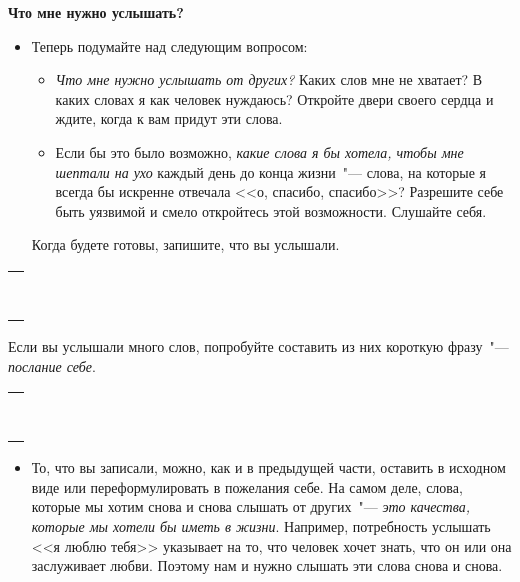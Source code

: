 \newpage
{\large \textbf{Что мне нужно услышать?}}
\begin{itemize}
	\item Теперь подумайте над следующим вопросом:
	
	\begin{itemize}
		\item \emph{Что мне нужно услышать от других?} Каких слов мне не хватает? В каких словах я как человек нуждаюсь? Откройте двери своего сердца и ждите, когда к вам придут эти слова.
		
		\item Если бы это было возможно, \emph{какие слова я бы хотела, чтобы мне шептали на ухо} каждый день до конца жизни~"--- слова, на которые я всегда бы искренне отвечала <<о, спасибо, спасибо>>? Разрешите себе быть уязвимой и смело откройтесь этой возможности. Слушайте себя.
	\end{itemize}

	\itemWritingHand Когда будете готовы, запишите, что вы услышали.
\end{itemize}
\setlength{\extrarowheight}{2mm}
\begin{tabularx}{\textwidth}{X}
	\\
	\arrayrulecolor{gray}\hline\\
	\hline\\
	\hline\\
	\hline\\
	\hline\\
	\hline\\
	\hline\\
		\hline\\
			\hline\\
\end{tabularx}
\setlength{\extrarowheight}{0mm}
\begin{itemize}
	\itemWritingHand Если вы услышали много слов, попробуйте составить из них короткую фразу~"--- \emph{послание себе}. 
\end{itemize}
\setlength{\extrarowheight}{2mm}
\begin{tabularx}{\textwidth}{X}
	\\
	\arrayrulecolor{gray}\hline\\
	\hline\\
	\hline\\
	\hline\\
	\hline\\
	\hline\\
	\hline\\
		\hline\\
			\hline\\
\end{tabularx}
\setlength{\extrarowheight}{0mm}
\begin{itemize}
	\item То, что вы записали, можно, как и в предыдущей части, оставить в исходном виде или переформулировать в пожелания себе. На самом деле, слова, которые мы хотим снова и снова слышать  от других~"--- \emph{это качества, которые мы хотели бы иметь в жизни}. Например, потребность услышать <<я люблю тебя>> указывает на то, что человек хочет знать, что он или она заслуживает любви. Поэтому нам и нужно слышать эти слова снова и снова.
\end{itemize}

